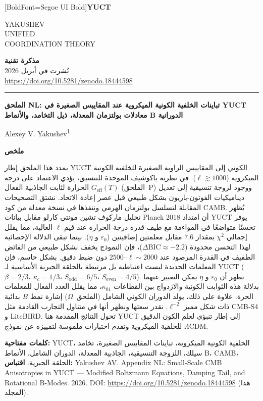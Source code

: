 \documentclass[11pt,a4paper]{article}
\newcommand{\makeheader}{%
	\noindent
	\begin{minipage}{0.17\textwidth}
		\raggedright
		{\fontspec{Segoe UI}[BoldFont=Segoe UI Bold]\bfseries\color{skyblue}\fontsize{46}{46}\selectfont YUCT}%
	\end{minipage}%
	\hspace{30pt}
	\begin{minipage}{0.32\textwidth}
		\raggedright
		{\sffamily\fontsize{11}{13}\selectfont YAKUSHEV\\ UNIFIED\\ COORDINATION THEORY}%
	\end{minipage}%
	\hfill
	\begin{minipage}{0.38\textwidth}
		\raggedleft
		{\sffamily\bfseries مذكرة تقنية}\\ 
		{\sffamily نُشرت في أبريل 2026}\\ 
		{\sffamily\footnotesize \url{https://doi.org/10.5281/zenodo.18444598}}%
	\end{minipage}
	\par\vspace{5pt}
	\noindent\textcolor{gold}{\rule{\textwidth}{1.6pt}}
	\par\vspace{0pt}
}
\begin{document}
	\thispagestyle{firstpage}
	\makeheader
	
	\vspace{0cm}
	{\LARGE\bfseries الملحق NL: تباينات الخلفية الكونية الميكروية عند المقاييس الصغيرة في YUCT \\ 
		\Large معادلات بولتزمان المعدلة، ذيل التخامد، والأنماط B الدورانية \par}
	\vspace{0.2cm}
	
	{\large Alexey V. Yakushev\textsuperscript{1}} \\
	\vspace{0.0cm}
	
	{\color{darkblue}\textbf{\LARGE ملخص}} \par
	{\large
		\noindent
		يمدد هذا الملحق إطار YUCT الكوني إلى المقاييس الزاوية الصغيرة للخلفية الكونية الميكروية ($\ell \gtrsim 1000$). في نظرية ياكوشيف الموحدة للتنسيق، يؤدي الاعتماد على درجة الحرارة لثابت الجاذبية الفعال $G_{\mathrm{eff}}(T)$ (الملحق~P) ووجود لزوجة تنسيقية إلى تعديل ديناميكيات الفوتون-باريون بشكل طبيعي قبل عصر إعادة الاتحاد. نشتق التصحيحات المقابلة لتسلسل بولتزمان الهرمي وننفذها في نسخة معدلة من كود CAMB. يُظهر تحليل ماركوف تشين مونتي كارلو مقابل بيانات Planck 2018 أن امتداد YUCT يوفر تحسنًا متواضعًا في المواءمة مع طيف قدرة درجة الحرارة عند قيم $\ell$ العالية، مما يقلل إجمالي $\chi^2$ بمقدار $7.6$ مقابل معلمتين إضافيتين ($\varepsilon_0$ و $\eta$). بينما تبقى الدلالة الإحصائية لهذا التحسن محدودة ($\Delta\mathrm{BIC} \approx -2.2$)، فإن النموذج يخفف بشكل طبيعي من الفائض الطفيف في القدرة المرصود عند $\ell \sim 2000$--$2500$ دون ضبط دقيق. بشكل حاسم، فإن المعلمات الجديدة ليست اعتباطية بل مرتبطة بالحلقة الجبرية الأساسية لـ YUCT ($\beta=2/3$، $\kappa_c=1/3$، $S_{\mathrm{odd}}=6/5$، $S_{\mathrm{even}}=4/5$). نظهر أن $\varepsilon_0$ و $\eta$ يمكن التعبير عنهما بدلالة هذه الثوابت الكونية والازدواج بين القطاعات $\kappa_{01}$، مما يقلل العدد الفعال للمعلمات الحرة. علاوة على ذلك، يولد الدوران الكوني الشامل (الملحق~$\Omega$) إشارة نمط $B$ بدائية ذات شكل مميز $\ell^{-2}$. نقدر سعتها ونظهر أنها في متناول التجارب القادمة مثل CMB‑S4 و LiteBIRD. تحول النتائج المقدمة هنا YUCT إلى إطار تنبؤي لعلم الكون الدقيق للخلفية الميكروية وتقدم اختبارات ملموسة لتمييزه عن نموذج $\Lambda$CDM.
	}
	
	\vspace{0.1cm}
	\noindent
	{\color{darkblue}\textbf{كلمات مفتاحية:}} YUCT، الخلفية الكونية الميكروية، تباينات المقاييس الصغيرة، تخامد سيلك، اللزوجة التنسيقية، الجاذبية المعدلة، الدوران الشامل، الأنماط B، CAMB، الحلقة الجبرية.
	\vspace{0.1cm}
	\noindent
	{\color{darkblue}\textbf{اقتباس:}} Yakushev AV. Appendix NL: Small‑Scale CMB Anisotropies in YUCT — Modified Boltzmann Equations, Damping Tail, and Rotational B‑Modes. 2026. DOI: \url{https://doi.org/10.5281/zenodo.18444598} (هذا المجلد).
	
\end{document}
